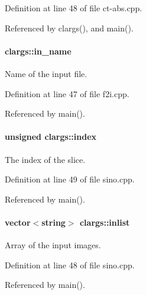 Definition at line 48 of file ct-\/abs.cpp.



Referenced by clargs(), and main().

\hypertarget{structclargs_a84359d967cb5060793f72543b83093ff}{
\paragraph[{in\_\-name}]{ {\bf clargs::in\_\-name}}\hfill}
\label{structclargs_a84359d967cb5060793f72543b83093ff}


Name of the input file. 



Definition at line 47 of file f2i.cpp.



Referenced by main().

\hypertarget{structclargs_acc40456fdf94c62c400a8a963261a6b3}{
\paragraph[{index}]{\setlength{\rightskip}{0pt plus 5cm}unsigned {\bf clargs::index}}\hfill}
\label{structclargs_acc40456fdf94c62c400a8a963261a6b3}


The index of the slice. 



Definition at line 49 of file sino.cpp.



Referenced by main().

\hypertarget{structclargs_a193c55eaced81862707a733b800295c5}{
\paragraph[{inlist}]{\setlength{\rightskip}{0pt plus 5cm}vector$<$string$>$ {\bf clargs::inlist}}\hfill}
\label{structclargs_a193c55eaced81862707a733b800295c5}


Array of the input images. 



Definition at line 48 of file sino.cpp.



Referenced by main().

